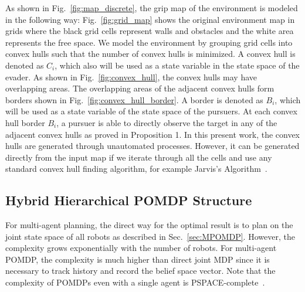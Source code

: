 \documentclass[../main.tex]{subfiles}
\begin{document}
As shown in Fig.~\ref{fig:map_discrete}, the grip map of the environment is modeled in the following way:
Fig.~\ref{fig:grid_map} shows the original environment map in grids where the black grid cells represent walls and obstacles and the white area represents the free space. We model the environment by grouping grid cells into convex hulls such that the number of convex hulls is minimized.
A convex hull is denoted as $C_i$, which also will be used as a state variable in the state space of the evader. As shown in Fig.~\ref{fig:convex_hull}, the convex hulls may have overlapping areas. The overlapping areas of the adjacent convex hulls form borders shown in Fig.~\ref{fig:convex_hull_border}. A border is denoted as $B_i$, which will be used as a state variable of the state space of the pursuers. At each convex hull border $B_i$, a pursuer is able to directly observe the target in any of the adjacent convex hulls as proved in Proposition 1.
In this present work, the convex hulls are generated through unautomated processes. However, it can be generated directly from the input map if we iterate through all the cells and use any standard convex hull finding algorithm, for example Jarvis’s Algorithm~\cite{eddy1977new}.

\subsection{Hybrid Hierarchical POMDP Structure} \label{sec:hhpomdp_struct}
For multi-agent planning, the direct way for the optimal result is to plan on the joint state space of all robots as described in Sec.~\ref{sec:MPOMDP}. However, the complexity grows exponentially with the number of robots. For multi-agent POMDP, the complexity is much higher than direct joint MDP since it is necessary to track history and record the belief space vector. Note that the complexity of POMDPs even with a single agent is PSPACE-complete~\cite{papadimitriou1987complexity}.
\end{document}
